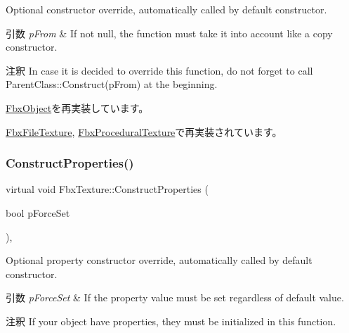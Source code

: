 Optional constructor override, automatically called by default constructor. 
\begin{DoxyParams}{引数}
{\em p\+From} & If not null, the function must take it into account like a copy constructor. \\
\hline
\end{DoxyParams}
\begin{DoxyRemark}{注釈}
In case it is decided to override this function, do not forget to call Parent\+Class\+::\+Construct(p\+From) at the beginning. 
\end{DoxyRemark}


\hyperlink{class_fbx_object_a313503bc645af3fdceb4a99ef5cea7eb}{Fbx\+Object}を再実装しています。



\hyperlink{class_fbx_file_texture_a107d1612fc50f17722c77ee8df236eeb}{Fbx\+File\+Texture}, \hyperlink{class_fbx_procedural_texture_a2386483aef2766c16c911e6fd6539d32}{Fbx\+Procedural\+Texture}で再実装されています。

\mbox{\label{class_fbx_texture_a851d5c4c96fb5023c004c88aeab2275b}} 
\subsubsection{\texorpdfstring{Construct\+Properties()}{ConstructProperties()}}
{\footnotesize\ttfamily virtual void Fbx\+Texture\+::\+Construct\+Properties (\begin{DoxyParamCaption}\item[{bool}]{p\+Force\+Set }\end{DoxyParamCaption})\hspace{0.3cm}{\ttfamily [protected]}, {\ttfamily [virtual]}}

Optional property constructor override, automatically called by default constructor. 
\begin{DoxyParams}{引数}
{\em p\+Force\+Set} & If the property value must be set regardless of default value. \\
\hline
\end{DoxyParams}
\begin{DoxyRemark}{注釈}
If your object have properties, they must be initialized in this function. 
\end{DoxyRemark}


